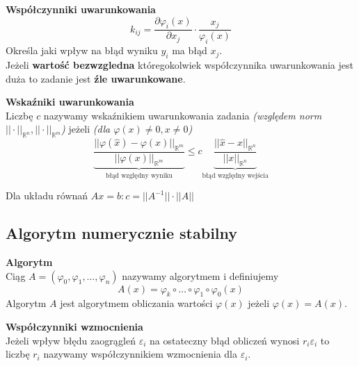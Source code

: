 \documentclass[../mn-notatki.tex]{subfiles}
\begin{document}
\begin{tcolorbox}
\textbf{Współczynniki uwarunkowania}\\
\[
k_{ij} = \frac{\partial \varphi_i(x)}{\partial x_j} \cdot \frac{x_j}{\varphi_i(x)}
\]
    Określa jaki wpływ na błąd wyniku $y_i$ ma błąd $x_j$.\\
     Jeżeli \textbf{wartość bezwzgledna} któregokolwiek współczynnika
uwarunkowania jest duża to zadanie jest \textbf{źle uwarunkowane}.

\end{tcolorbox}

\begin{tcolorbox}
\textbf{Wskaźniki uwarunkowania}\\
Liczbę $c$ nazywamy wskaźnikiem uwarunkowania zadania
\textit{(względem norm $||\cdot||_{\mathbb{R}^n}, ||\cdot||_{\mathbb{R}^m}$)}
jeżeli \textit{(dla $\varphi(x) \neq 0, x \neq 0$)}
\[
\underbrace{\frac{||\varphi(\hat{x}) - \varphi(x)||_{\mathbb{R}^m}}{||\varphi(x)||_{\mathbb{R}^m}}}_{\text{błąd względny wyniku}}
\leqslant
c \underbrace{\frac{||\hat{x} - x||_{\mathbb{R}^n}}{||x||_{\mathbb{R}^n}}}_{\text{błąd względny wejścia}}
\]

Dla układu równań
$Ax = b :
c = || A^ {−1}|| \cdot ||A||$
\end{tcolorbox}

\subsection{Algorytm numerycznie stabilny}

\begin{tcolorbox}
\textbf{Algorytm}\\
Ciąg $A = (\varphi_0, \varphi_1, \ldots, \varphi_n)$ nazywamy algorytmem i definiujemy
\[
A(x) = \varphi_k \circ \ldots \circ \varphi_1 \circ \varphi_0(x)
\]
Algorytm $A$ jest algorytmem obliczania wartości $\varphi(x)$ jeżeli
$\varphi(x) = A(x)$.
\end{tcolorbox}

\begin{tcolorbox}
\textbf{Współczynniki wzmocnienia}\\
Jeżeli wpływ błędu zaogrągleń $\varepsilon_i$ na ostateczny błąd obliczeń
wynosi $r_i \varepsilon_i$ to liczbę $r_i$ nazywamy współczynnikiem wzmocnienia
dla $\varepsilon_i$.
\end{tcolorbox}
\end{document}
